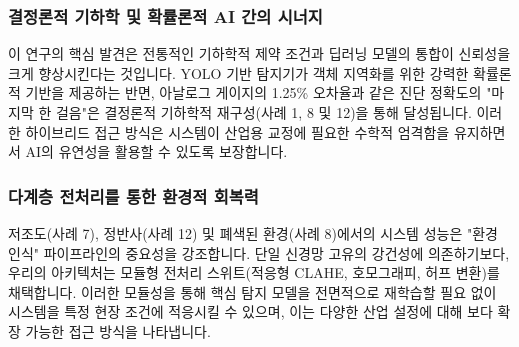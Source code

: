 \subsubsection{결정론적 기하학 및 확률론적 AI 간의 시너지}
이 연구의 핵심 발견은 전통적인 기하학적 제약 조건과 딥러닝 모델의 통합이 신뢰성을 크게 향상시킨다는 것입니다.
YOLO 기반 탐지기가 객체 지역화를 위한 강력한 확률론적 기반을 제공하는 반면, 아날로그 게이지의 1.25\% 오차율과 같은 진단 정확도의 "마지막 한 걸음"은 결정론적 기하학적 재구성(사례 1, 8 및 12)을 통해 달성됩니다.
이러한 하이브리드 접근 방식은 시스템이 산업용 교정에 필요한 수학적 엄격함을 유지하면서 AI의 유연성을 활용할 수 있도록 보장합니다.

\subsubsection{다계층 전처리를 통한 환경적 회복력}
저조도(사례 7), 정반사(사례 12) 및 폐색된 환경(사례 8)에서의 시스템 성능은 "환경 인식" 파이프라인의 중요성을 강조합니다.
단일 신경망 고유의 강건성에 의존하기보다, 우리의 아키텍처는 모듈형 전처리 스위트(적응형 CLAHE, 호모그래피, 허프 변환)를 채택합니다.
이러한 모듈성을 통해 핵심 탐지 모델을 전면적으로 재학습할 필요 없이 시스템을 특정 현장 조건에 적응시킬 수 있으며, 이는 다양한 산업 설정에 대해 보다 확장 가능한 접근 방식을 나타냅니다.

